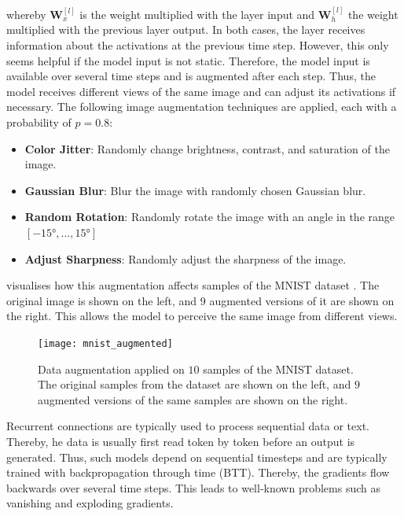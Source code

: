 whereby $\boldsymbol{W}_x^{[l]}$ is the weight multiplied with the layer input and $\boldsymbol{W}_h^{[l]}$ the weight multiplied with the previous layer output. In both cases, the layer receives information about the activations at the previous time step.
However, this only seems helpful if the model input is not static. Therefore, the model input is available over several time steps and is augmented after each step. Thus, the model receives different views of the same image and can adjust its activations if necessary. The following image augmentation techniques are applied, each with a probability of $p=0.8$:

\begin{itemize}
	\item \textbf{Color Jitter}: Randomly change brightness, contrast, and saturation of the image.
	\item \textbf{Gaussian Blur}: Blur the image with randomly chosen Gaussian blur.
	\item \textbf{Random Rotation}: Randomly rotate the image with an angle in the range $[-15°, ..., 15°]$
	\item \textbf{Adjust Sharpness}: Randomly adjust the sharpness of the image.
\end{itemize}

 visualises how this augmentation affects samples of the MNIST dataset \cite{Lecun_Bottou_Bengio_Haffner_1998}. The original image is shown on the left, and $9$ augmented versions of it are shown on the right. This allows the model to perceive the same image from different views.

\begin{figure}[h]
    \centering
    \texttt{[image: mnist\_augmented]}
    \caption[Data augmentation applied on $10$ samples of the MNIST dataset]{Data augmentation applied on $10$ samples of the MNIST dataset. The original samples from the dataset are shown on the left, and $9$ augmented versions of the same samples are shown on the right.}
\end{figure}


Recurrent connections are typically used to process sequential data or text. Thereby, he data is usually first read token by token before an output is generated. Thus, such models depend on sequential timesteps and are typically trained with backpropagation through time (BTT). Thereby, the gradients flow backwards over several time steps. This leads to well-known problems such as vanishing and exploding gradients.

